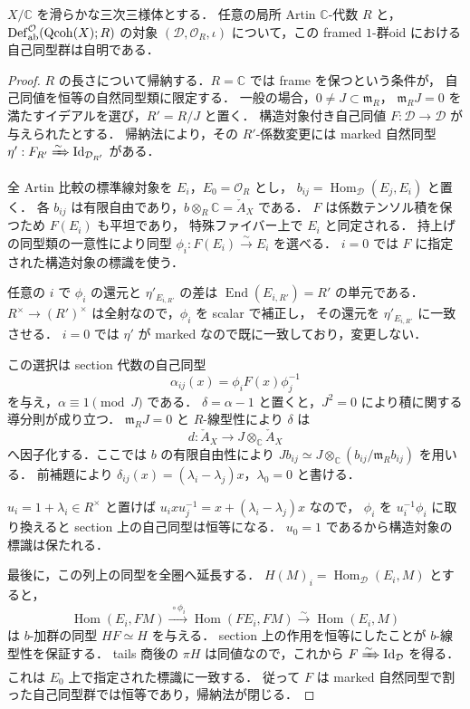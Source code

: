 \begin{proposition}
\label{prop:abel-framed-artin-automorphisms}
$X/\mathbb C$ を滑らかな三次三様体とする．
任意の局所 Artin $\mathbb C$-代数 $R$ と，
$\operatorname{Def}^{\mathcal O}_{\rm ab}(\operatorname{Qcoh}(X);R)$ の対象
$(\mathcal D,\mathcal O_R,\iota)$ について，この framed $1$-群oid における
自己同型群は自明である．
\end{proposition}
\begin{proof}
$R$ の長さについて帰納する．$R=\mathbb C$ では frame を保つという条件が，
自己同値を恒等の自然同型類に限定する．
一般の場合，$0\ne J\subset\mathfrak m_R$，
$\mathfrak m_RJ=0$ を満たすイデアルを選び，$R'=R/J$ と置く．
構造対象付き自己同値 $F:\mathcal D\to\mathcal D$ が与えられたとする．
帰納法により，その $R'$-係数変更には marked 自然同型
$\eta':F_{R'}\xRightarrow{\sim}\operatorname{Id}_{\mathcal D_{R'}}$ がある．

全 Artin 比較の標準線対象を $E_i$，$E_0=\mathcal O_R$ とし，
$b_{ij}=\operatorname{Hom}_{\mathcal D}(E_j,E_i)$ と置く．
各 $b_{ij}$ は有限自由であり，$b\otimes_R\mathbb C=\check A_X$ である．
$F$ は係数テンソル積を保つため $F(E_i)$ も平坦であり，
特殊ファイバー上で $E_i$ と同定される．
持上げの同型類の一意性により同型
$\phi_i:F(E_i)\xrightarrow{\sim}E_i$ を選べる．
$i=0$ では $F$ に指定された構造対象の標識を使う．

任意の $i$ で $\phi_i$ の還元と $\eta'_{E_{i,R'}}$ の差は
$\operatorname{End}(E_{i,R'})=R'$ の単元である．
$R^\times\to(R')^\times$ は全射なので，$\phi_i$ を scalar で補正し，
その還元を $\eta'_{E_{i,R'}}$ に一致させる．
$i=0$ では $\eta'$ が marked なので既に一致しており，変更しない．

この選択は section 代数の自己同型
\[
 \alpha_{ij}(x)=\phi_iF(x)\phi_j^{-1}
\]
を与え，$\alpha\equiv1\pmod J$ である．
$\delta=\alpha-1$ と置くと，$J^2=0$ により積に関する導分則が成り立つ．
$\mathfrak m_RJ=0$ と $R$-線型性により $\delta$ は
\[
 d:\check A_X\longrightarrow J\otimes_{\mathbb C}\check A_X
\]
へ因子化する．ここでは $b$ の有限自由性により
$Jb_{ij}\simeq J\otimes_{\mathbb C}(b_{ij}/\mathfrak m_Rb_{ij})$
を用いる．
前補題により
$\delta_{ij}(x)=(\lambda_i-\lambda_j)x$，$\lambda_0=0$ と書ける．

$u_i=1+\lambda_i\in R^\times$ と置けば
$u_ixu_j^{-1}=x+(\lambda_i-\lambda_j)x$ なので，
$\phi_i$ を $u_i^{-1}\phi_i$ に取り換えると section 上の自己同型は恒等になる．
$u_0=1$ であるから構造対象の標識は保たれる．

最後に，この列上の同型を全圏へ延長する．
$H(M)_i=\operatorname{Hom}_{\mathcal D}(E_i,M)$ とすると，
\[
 \operatorname{Hom}(E_i,FM)
 \xrightarrow{\ \circ\phi_i\ }
 \operatorname{Hom}(FE_i,FM)
 \xrightarrow{\sim}\operatorname{Hom}(E_i,M)
\]
は $b$-加群の同型 $HF\simeq H$ を与える．
section 上の作用を恒等にしたことが $b$-線型性を保証する．
tails 商後の $\pi H$ は同値なので，これから
$F\xRightarrow{\sim}\operatorname{Id}_{\mathcal D}$ を得る．
これは $E_0$ 上で指定された標識に一致する．
従って $F$ は marked 自然同型で割った自己同型群では恒等であり，帰納法が閉じる．
\end{proof}

